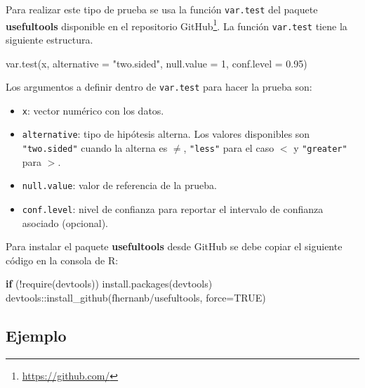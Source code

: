 \documentclass[
]{book}
\makeatletter
\newenvironment{Shaded}{\begin{snugshade}}{\end{snugshade}}
\newcommand{\AttributeTok}[1]{\textcolor[rgb]{0.77,0.63,0.00}{#1}}
\newcommand{\ConstantTok}[1]{\textcolor[rgb]{0.00,0.00,0.00}{#1}}
\newcommand{\ControlFlowTok}[1]{\textcolor[rgb]{0.13,0.29,0.53}{\textbf{#1}}}
\newcommand{\DecValTok}[1]{\textcolor[rgb]{0.00,0.00,0.81}{#1}}
\newcommand{\FloatTok}[1]{\textcolor[rgb]{0.00,0.00,0.81}{#1}}
\newcommand{\FunctionTok}[1]{\textcolor[rgb]{0.00,0.00,0.00}{#1}}
\newcommand{\NormalTok}[1]{#1}
\newcommand{\SpecialCharTok}[1]{\textcolor[rgb]{0.00,0.00,0.00}{#1}}
\newcommand{\StringTok}[1]{\textcolor[rgb]{0.31,0.60,0.02}{#1}}
\providecommand{\tightlist}{%
  \setlength{\itemsep}{0pt}\setlength{\parskip}{0pt}}
\renewcommand{\href}[2]{#2\footnote{\url{#1}}}
\newenvironment{kframe}{%
\medskip{}
\setlength{\fboxsep}{.8em}
 \def\at@end@of@kframe{}%
 \ifinner\ifhmode%
  \def\at@end@of@kframe{\end{minipage}}%
  \begin{minipage}{\columnwidth}%
 \fi\fi%
 \def\FrameCommand##1{\hskip\@totalleftmargin \hskip-\fboxsep
 \colorbox{shadecolor}{##1}\hskip-\fboxsep
     \hskip-\linewidth \hskip-\@totalleftmargin \hskip\columnwidth}%
 \MakeFramed {\advance\hsize-\width
   \@totalleftmargin\z@ \linewidth\hsize
   \@setminipage}}%
 {\par\unskip\endMakeFramed%
 \at@end@of@kframe}
\renewenvironment{Shaded}{\begin{kframe}}{\end{kframe}}
\makeatother
\begin{document}
Para realizar este tipo de prueba se usa la función \texttt{var.test} del paquete \textbf{usefultools} \citep{R-usefultools} disponible en el repositorio \href{https://github.com/}{GitHub}. La función \texttt{var.test} tiene la siguiente estructura.

\begin{Shaded}
\begin{Highlighting}[]
\FunctionTok{var.test}\NormalTok{(x, }\AttributeTok{alternative =} \StringTok{"two.sided"}\NormalTok{,}
         \AttributeTok{null.value =} \DecValTok{1}\NormalTok{, }\AttributeTok{conf.level =} \FloatTok{0.95}\NormalTok{)}
\end{Highlighting}
\end{Shaded}

Los argumentos a definir dentro de \texttt{var.test} para hacer la prueba son:

\begin{itemize}
\tightlist
\item
  \texttt{x}: vector numérico con los datos.
\item
  \texttt{alternative}: tipo de hipótesis alterna. Los valores disponibles son \texttt{"two.sided"} cuando la alterna es \(\neq\), \texttt{"less"} para el caso \(<\) y \texttt{"greater"} para \(>\).
\item
  \texttt{null.value}: valor de referencia de la prueba.
\item
  \texttt{conf.level}: nivel de confianza para reportar el intervalo de confianza asociado (opcional).
\end{itemize}

Para instalar el paquete \textbf{usefultools} desde GitHub se debe copiar el siguiente código en la consola de R:

\begin{Shaded}
\begin{Highlighting}[]
\ControlFlowTok{if}\NormalTok{ (}\SpecialCharTok{!}\FunctionTok{require}\NormalTok{(}\StringTok{\textquotesingle{}devtools\textquotesingle{}}\NormalTok{)) }\FunctionTok{install.packages}\NormalTok{(}\StringTok{\textquotesingle{}devtools\textquotesingle{}}\NormalTok{)}
\NormalTok{devtools}\SpecialCharTok{::}\FunctionTok{install\_github}\NormalTok{(}\StringTok{\textquotesingle{}fhernanb/usefultools\textquotesingle{}}\NormalTok{, }\AttributeTok{force=}\ConstantTok{TRUE}\NormalTok{)}
\end{Highlighting}
\end{Shaded}

\hypertarget{ejemplo-68}{%
\subsection*{Ejemplo}\label{ejemplo-68}}
\end{document}
